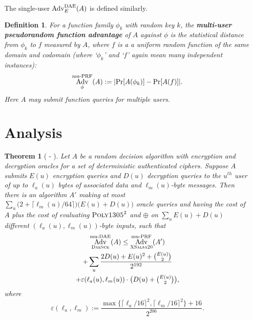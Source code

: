\documentclass[draft]{article}
\newtheorem{definition}{Definition}
\newtheorem{theorem}{Theorem}
\newcommand{\term}[1]{\textbf{#1}}
\def\operatorsc#1{{%
  \ifmmode\let\next=\operatorname\else\let\next=\relax\fi\next{\textsc{#1}}}}
\def\Salsa#1/{\operatorsc{Salsa#1}}
\def\XSalsa#1/{\operatorsc{XSalsa#1}}
\def\Poly#1/{\operatorsc{Poly#1}}
\def\Daence/{\operatorsc{Daence}}
\def\muPRF{%
  \ifmmode\def\next{\operatorname{mu-PRF}}%
    \else\def\next/{mu-\textsc{prf}}%
  \fi\next}
\def\DAE{%
  \ifmmode\def\next{\operatorname{DAE}}%
    \else\def\next/{\textsc{dae}}%
  \fi\next}
\def\muDAE{%
  \ifmmode\def\next{\operatorname{mu-DAE}}%
    \else\def\next/{mu-\textsc{dae}}%
  \fi\next}
\DeclareMathOperator{\Adv}{Adv}
\newcommand{\collisionbound}{\varepsilon}
\begin{document}
The single-user $\Adv^{\DAE}_E(A)$ is defined similarly.

\begin{definition}
  For a function family $\phi_k$ with random key $k$, the
   \term{multi-user pseudorandom function advantage}
   of $A$ against $\phi$ is the statistical distance from $\phi_k$ to
   $f$ measured by $A$, where $f$ is a a uniform random function of
   the same domain and codomain (where `$\phi_k$' and `$f$' again
   mean many independent instances):
  \[
    \Adv^{\muPRF}_\phi(A) := \lvert\Pr[A(\phi_k)] - \Pr[A(f)]\rvert.
  \]
  Here $A$ may submit function queries for \emph{multiple} users.
\end{definition}

\section{Analysis}

\begin{theorem}[\Salsa20/-\Daence/]\label{thm-salsa20-daence}
  Let $A$ be a random decision algorithm with encryption and
   decryption oracles for a set of deterministic authenticated
   ciphers.
  Suppose $A$ submits $E(u)$ encryption queries and $D(u)$ decryption
   queries to the $u^{\mathit{th}}$ user of up to $\ell_a(u)$ bytes of
   associated data and $\ell_m(u)$-byte messages.
  Then there is an algorithm $A'$ making at most
   $\sum_u \bigl(2 + \lceil\ell_m(u)/64\rceil\bigr)
     \bigl(E(u) + D(u)\bigr)$
   oracle queries and having the cost of $A$ plus the cost of
   evaluating $\Poly1305/^2$ and $\oplus$ on
   $\sum_u E(u) + D(u)$
   different $(\ell_a(u), \ell_m(u))$-byte inputs,
   such that
%
  \begin{multline*}
    \Adv^{\muDAE}_{\Daence/}(A)
     \leq \Adv^{\muPRF}_{\XSalsa20/}(A') \\
            + \sum_u
                \frac{2 D(u) + E(u)^2 + \binom{E(u)}{2}}
                     {2^{192}} \\
                + \collisionbound(\ell_a(u), \ell_m(u))
                  \cdot
                  {\textstyle\bigl(D(u) + \binom{E(u)}{2}\bigr)},
  \end{multline*}
%
   where
  \[
    \collisionbound(\ell_a, \ell_m)
    := \frac{\max\{\lceil\ell_a/16\rceil^2, \lceil\ell_m/16\rceil^2\}
             + 16}
            {2^{206}}.
  \]
\end{theorem}
\end{document}
